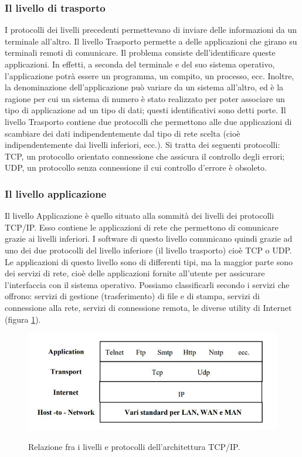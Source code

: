 \documentclass[12pt, a4paper, oneside]{book}
\begin{document}
\subsubsection{Il livello di trasporto}
I protocolli dei livelli precedenti permettevano di inviare delle informazioni da un terminale all'altro. Il livello Trasporto permette a delle applicazioni che girano su terminali remoti di comunicare. Il problema consiste dell'identificare queste applicazioni. In effetti, a seconda del terminale e del suo sistema operativo, l'applicazione potrà essere un programma, un compito, un processo, ecc. Inoltre, la denominazione dell'applicazione può variare da un sistema all'altro, ed è la ragione per cui un sistema di numero è stato realizzato per poter associare un tipo di applicazione ad un tipo di dati; questi identificativi sono detti porte. Il livello Trasporto contiene due protocolli che permettono alle due applicazioni di scambiare dei dati indipendentemente dal tipo di rete scelta (cioè indipendentemente dai livelli inferiori, ecc.). Si tratta dei seguenti protocolli: TCP, un protocollo orientato connessione che assicura il controllo degli errori; UDP, un protocollo senza connessione il cui controllo d'errore è obsoleto. 
\subsubsection{Il livello applicazione}
Il livello Applicazione è quello situato alla sommità dei livelli dei protocolli TCP/IP. Esso contiene le applicazioni di rete che permettono di comunicare grazie ai livelli inferiori. I software di questo livello comunicano quindi grazie ad uno dei due protocolli del livello inferiore (il livello trasporto) cioè TCP o UDP. 
\\Le applicazioni di questo livello sono di differenti tipi, ma la maggior parte sono dei servizi di rete, cioè delle applicazioni fornite all'utente per assicurare l'interfaccia con il sistema operativo. Possiamo classificarli secondo i servizi che offrono: servizi di gestione (trasferimento) di file e di stampa, servizi di connessione alla rete, servizi di connessione remota, le diverse utility di Internet (figura \ref{1}). 
\begin{figure}[H]
	\centering
	\includegraphics[width=12cm]{Immagini/2}
	\label{1}
	\caption{ Relazione fra i livelli e protocolli dell'architettura TCP/IP.}
\end{figure}
\end{document}

